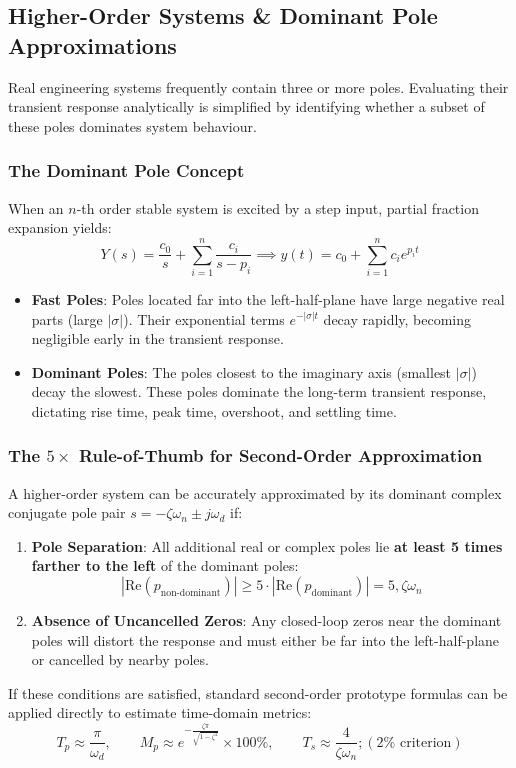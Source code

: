 \documentclass[12pt,onecolumn,twoside ]{article}
\begin{document}
	\subsection{Higher-Order Systems \& Dominant Pole Approximations}
	Real engineering systems frequently contain three or more poles. Evaluating their transient response analytically is simplified by identifying whether a subset of these poles dominates system behaviour.
	\subsubsection{The Dominant Pole Concept}
	When an $n$-th order stable system is excited by a step input, partial fraction expansion yields: \[
	Y(s) = \frac{c_0}{s} + \sum_{i=1}^{n} \frac{c_i}{s - p_i} \implies y(t) = c_0 + \sum_{i=1}^{n} c_i e^{p_i t}
	\]
	\begin{itemize}
		\item
		\textbf{Fast Poles}: Poles located far into the left-half-plane have large negative real parts (large $|\sigma|$). Their exponential terms $e^{-|\sigma|t}$ decay rapidly, becoming negligible early in the transient response.
		\item
		\textbf{Dominant Poles}: The poles closest to the imaginary axis (smallest $|\sigma|$) decay the slowest. These poles dominate the long-term transient response, dictating rise time, peak time, overshoot, and settling time.
	\end{itemize}
	\subsubsection{The $5\times$ Rule-of-Thumb for Second-Order Approximation}
	A higher-order system can be accurately approximated by its dominant complex conjugate pole pair $s = -\zeta\omega_n \pm j\omega_d$ if:
	\begin{enumerate}
		\item
		\textbf{Pole Separation}: All additional real or complex poles lie \textbf{at least 5 times farther to the left} of the dominant poles: \[
		|\text{Re}(p_{\text{non-dominant}})| \ge 5 \cdot |\text{Re}(p_{\text{dominant}})| = 5 , \zeta\omega_n
		\]
		\item
		\textbf{Absence of Uncancelled Zeros}: Any closed-loop zeros near the dominant poles will distort the response and must either be far into the left-half-plane or cancelled by nearby poles.
	\end{enumerate}
	If these conditions are satisfied, standard second-order prototype formulas can be applied directly to estimate time-domain metrics: \[
	T_p \approx \frac{\pi}{\omega_d}, \qquad M_p \approx e^{-\frac{\zeta\pi}{\sqrt{1-\zeta^2}}} \times 100\%, \qquad T_s \approx \frac{4}{\zeta\omega_n} ; (2\% \text{ criterion})
	\]
	
\end{document}
